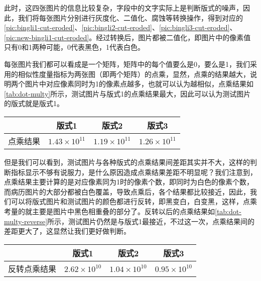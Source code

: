 此时，这四张图片的信息比较复杂，字段中的文字实际上是判断版式的噪声，因此，我们将每张图片分别进行灰度化、二值化、腐蚀等转换操作，得到对应的\autoref{pic:bingli1-cut-eroded}、\autoref{pic:bingli2-cut-eroded}、\autoref{pic:bingli3-cut-eroded}、\autoref{pic:new-bingli1-cut-eroded}。经过转换后，图片都被二值化，即图片中的像素值只有0和1两种可能，0代表黑色，1代表白色。

每张图片我们都可以看成是一个矩阵，矩阵中的每个值要么是0，要么是1，我们采用的相似性度量指标为两张图（即两个矩阵）的点乘，显然，点乘的结果越大，说明两个图片中对应像素同时为1的像素点越多，也就可以认为越相似，点乘结果如\autoref{tab:dot-multy}所示，测试图片与版式1的点乘结果最大，因此可以认为测试图片的版式就是版式1。
\begin{table}
	\label{tab:dot-multy}
	\centering
	\vspace{10pt}
  \renewcommand\arraystretch{1.5}  %
	\begin{tabular}{|c||c|c|c|}
		\hline
		&版式1&版式2&版式3\\
		\hline
		点乘结果&$1.43\times 10^{11}$&$1.19\times 10^{11}$&$1.26\times 10^{11}$\\
		\hline
	\end{tabular}
\end{table}

但是我们可以看到，测试图片与各种版式的点乘结果间差距其实并不大，这样的判断指标显示不够有说服力，是什么原因造成点乘结果差距不明显呢？我们注意到，点乘结果主要计算的是对应像素同为1时的像素个数，即同时为白色的像素个数，而病历图片的大部分都被白色覆盖，导致点乘后，各个结果都比较接近，因此，我们可以将版式图片和测试图片的颜色都进行反转，即黑变白，白变黑，这样，点乘考量的就主要是图片中黑色相重叠的部分了。反转以后的点乘结果如\autoref{tab:dot-multy-reverse}所示，测试图片仍然是与版式1最接近，不过这一次，点乘结果间的差距更大了，这显然让我们更好做判断。

\begin{table}
	\label{tab:dot-multy-reverse}
	\centering
	\vspace{10pt}
  \renewcommand\arraystretch{1.5}  %
	\begin{tabular}{|c||c|c|c|}
		\hline
		&版式1&版式2&版式3\\
		\hline
		反转点乘结果&$2.62\times 10^{10}$&$1.04\times 10^{10}$&$0.95\times 10^{10}$\\
		\hline
	\end{tabular}
\end{table}

